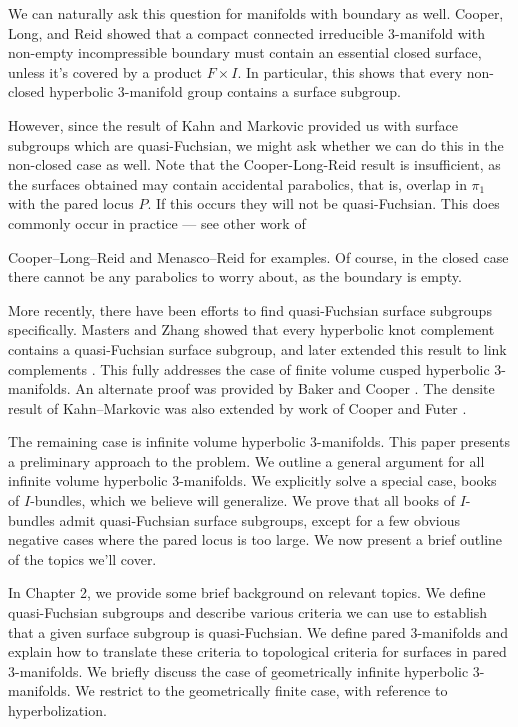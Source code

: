We can naturally ask this question for manifolds with boundary as well.
Cooper, Long, and Reid showed \cite{CLR} that a compact connected irreducible
$3$-manifold with non-empty incompressible boundary  must contain an essential
closed surface, unless it's covered by a product $F\times I$. In particular,
this shows that every non-closed hyperbolic $3$-manifold group contains
a surface subgroup.

However, since the result of Kahn and Markovic provided us with surface
subgroups which are quasi-Fuchsian, we might ask whether we can do this in the
non-closed case as well. Note that the Cooper-Long-Reid result is insufficient,
as the surfaces obtained may contain accidental parabolics, that is, overlap in
$\pi_1$ with the pared locus $P$. If this occurs they will not be
quasi-Fuchsian. This does commonly occur in practice --- see other work of

Cooper--Long--Reid \cite{CLRbundles} and Menasco--Reid \cite{MenascoReid} for
examples.  Of course, in the closed case there cannot be any parabolics to
worry about, as the boundary is empty.

More recently, there have been efforts to find quasi-Fuchsian surface subgroups
specifically. Masters and Zhang \cite{MZ} showed that every hyperbolic knot
complement contains a quasi-Fuchsian surface subgroup, and later extended this
result to link complements \cite{MZ2}. This fully addresses the case of finite
volume cusped hyperbolic $3$-manifolds. An alternate proof was provided by
Baker and Cooper \cite{BC}. The densite result of Kahn--Markovic was also
extended by work of Cooper and Futer \cite{CooperFuter}.

The remaining case is infinite volume hyperbolic $3$-manifolds. This paper
presents a preliminary approach to the problem. We outline a general argument
for all infinite volume hyperbolic $3$-manifolds. We explicitly solve a special
case, books of $I$-bundles, which we believe will generalize. We prove that all
books of $I$-bundles admit quasi-Fuchsian surface subgroups, except for a few
obvious negative cases where the pared locus is too large. We now present
a brief outline of the topics we'll cover.

In Chapter 2, we provide some brief background on relevant topics. We define
quasi-Fuchsian subgroups and describe various criteria we can use to establish
that a given surface subgroup is quasi-Fuchsian. We define pared $3$-manifolds
and explain how to translate these criteria to topological criteria for
surfaces in pared $3$-manifolds. We briefly discuss the case of geometrically
infinite hyperbolic $3$-manifolds. We restrict to the geometrically finite
case, with reference to hyperbolization.

